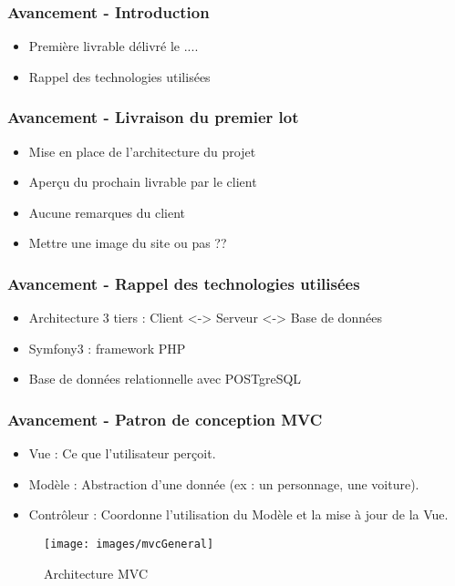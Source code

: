 \speaker{\Kafui}

\begin{frame}
  \frametitle{Avancement - Introduction}
  \begin{itemize}
	\item Première livrable délivré le ....
	\item Rappel des technologies utilisées
  \end{itemize}
\end{frame}

\begin{frame}
  \frametitle{Avancement - Livraison du premier lot}
  \begin{itemize}
	\item Mise en place de l'architecture du projet
	\item Aperçu du prochain livrable par le client
	\item Aucune remarques du client
	\item Mettre une image du site ou pas ??
  \end{itemize}
\end{frame}

\begin{frame}
  \frametitle{Avancement - Rappel des technologies utilisées}
  \begin{itemize}
	\item Architecture 3 tiers : Client <-> Serveur <-> Base de données
	\item Symfony3 : framework PHP 
	\item Base de données relationnelle avec POSTgreSQL
  \end{itemize}
\end{frame}

\begin{frame}
  \frametitle{Avancement - Patron de conception MVC}
  \begin{itemize}
	\item Vue : Ce que l'utilisateur perçoit.
	\item Modèle : Abstraction d'une donnée (ex : un personnage, une voiture).
	\item Contrôleur : Coordonne l'utilisation du Modèle et la mise à jour de la Vue.
  \end{itemize}

\begin{figure}[!h]
	\begin{center}
	\texttt{[image: images/mvcGeneral]}
	\caption{Architecture MVC}
	\end{center}
\end{figure}

\end{frame}

